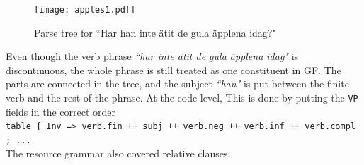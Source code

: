 \documentclass{report}
\begin{document}
\begin{figure}[h]
\texttt{[image: apples1.pdf]}
\caption{Parse tree for ``Har han inte ätit de gula äpplena idag?"}
\label{gfSwe:parsetree}
\end{figure}
Even though the verb phrase \emph{``har inte ätit de gula äpplena idag"} is discontinuous, the whole
phrase is still treated as one constituent in GF. The parts
are connected in the tree, and the subject \emph{``han"} is put between the
finite verb and the rest of the phrase.
At the code level, This is done by putting the \verb-VP- fields in the correct order\\
\verb|table { Inv => verb.fin ++ subj ++ verb.neg ++ verb.inf ++ verb.compl ; ... | \\

The resource grammar also covered relative clauses: 
\eenumsentence{\item[a]\shortexnt{5}{Hon & ser & pojken & som  &sover}
              {\emph{she} & \emph{sees} & \emph{the boy} & \emph{that} & \emph{sleeps}}
\item[b]\shortexnt{6}{Han & ser &katten & han  &tycker & om}
              {\emph{he} & \emph{sees} & \emph{the cat} & \emph{he} & \emph{likes} &}}
\end{document}
